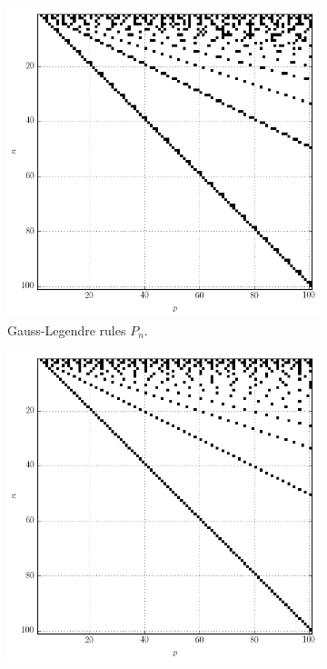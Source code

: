 \documentclass[a4paper,10pt]{article}
\begin{document}
\begin{figure}[ht!]
  \begin{minipage}[b]{0.49\linewidth}
  \begin{subfigure}[b]{\linewidth}
    \includegraphics[width=\textwidth]{./img/map_leg_100_100.png}
    \caption{Gauss-Legendre rules $P_n$.}
    \label{fig:map_leg_100_100}
  \end{subfigure}
  \end{minipage}
  \hfill
  \begin{minipage}[b]{0.49\linewidth}
  \begin{subfigure}[b]{\linewidth}
    \includegraphics[width=\textwidth]{./img/map_chebt_100_100.png}

\end{subfigure}
\end{minipage}
\end{figure}
\end{document}
